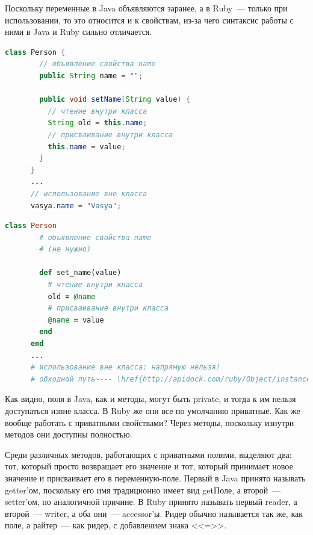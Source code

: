 \documentclass[a4paper, 14pt, titlepage]{extarticle}
\newenvironment{halfpage}%
    {\noindent\begin{minipage}[h]{0.49\linewidth}} %
    {\end{minipage}\hfill}
\begin{document}
  Поскольку переменные в Java объявляются заранее, а в Ruby~--- только при использовании, то это
  относится и к свойствам, из-за чего синтаксис работы с ними в Java и Ruby сильно отличается.

  \begin{halfpage}
    \begin{lstlisting}[language=Java, title={Свойство в Java}, gobble=6, texcl]
      class Person {
        // объявление свойства name
        public String name = "";

        public void setName(String value) {
          // чтение внутри класса
          String old = this.name;
          // присваивание внутри класса
          this.name = value;
        }
      }
      ...
      // использование вне класса
      vasya.name = "Vasya";
    \end{lstlisting}
  \end{halfpage}
  \begin{halfpage}
    \begin{lstlisting}[language=Ruby, title={Свойство в Ruby}, gobble=6, texcl]
      class Person
        # объявление свойства name
        # (не нужно)

        def set_name(value)
          # чтение внутри класса
          old = @name
          # присваивание внутри класса
          @name = value
        end
      end
      ...
      # использование вне класса: напрямую нельзя!
      # обходной путь~--- \href{http://apidock.com/ruby/Object/instance_variable_set}{\uline{instance\_variable\_set}}/\href{http://apidock.com/ruby/Object/instance_variable_get}{\uline{get}}
    \end{lstlisting}
  \end{halfpage}

  Как видно, поля в Java, как и методы, могут быть private, и тогда к им нельзя доступаться извне
  класса. В Ruby же они все по умолчанию приватные. Как же вообще работать с приватными свойствами?
  Через методы, поскольку изнутри методов они доступны полностью.

  Среди различных методов, работающих с приватными полями, выделяют два: тот, который просто
  возвращает его значение и тот, который принимает новое значение и присваивает его в
  переменную-поле. Первый в Java принято называть getter'ом, поскольку его имя традиционно имеет вид
  getПоле, а второй~--- setter'ом, по аналогичной причине. В Ruby принято называть первый
  reader, а второй~--- writer, а оба они~--- accessor'ы. Ридер обычно называется так же, как поле, а
  райтер~--- как ридер, с добавлением знака <<=>>.
\end{document}
